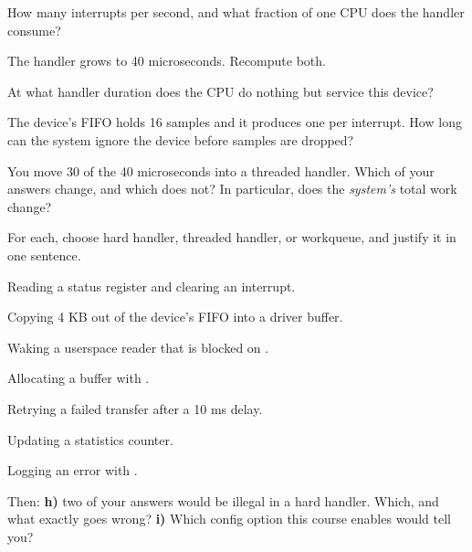  How many interrupts per second, and what fraction of one CPU does the handler consume?

 The handler grows to 40 microseconds. Recompute both.

 At what handler duration does the CPU do nothing but service this device?

 The device's FIFO holds 16 samples and it produces one per interrupt. How long can the
system ignore the device before samples are dropped?

 You move 30 of the 40 microseconds into a threaded handler. Which of your answers change,
and which does not? In particular, does the \emph{system's} total work change?

\label{c8:ex:5}

For each, choose hard handler, threaded handler, or workqueue, and justify it in one sentence.

 Reading a status register and clearing an interrupt.

 Copying 4 KB out of the device's FIFO into a driver buffer.

 Waking a userspace reader that is blocked on .

 Allocating a buffer with .

 Retrying a failed transfer after a 10 ms delay.

 Updating a statistics counter.

 Logging an error with .

Then: \textbf{h)} two of your answers would be illegal in a hard handler. Which, and what exactly
goes wrong? \textbf{i)} Which config option this course enables would tell you?

\label{c8:ex:6}

